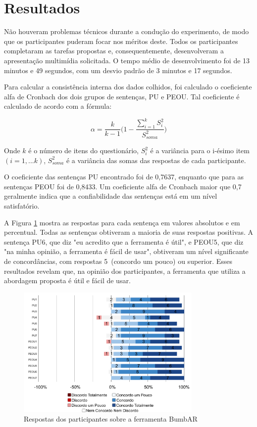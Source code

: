 \documentclass[../main.tex]{subfiles}
\begin{document}
\section{Resultados}
\label{sec:resultados}

Não houveram problemas técnicos durante a condução do experimento, de modo que os participantes puderam focar nos méritos deste. Todos os participantes completaram as tarefas propostas e, consequentemente, desenvolveram a apresentação multimídia solicitada. O tempo médio de desenvolvimento foi de 13 minutos e 49 segundos, com um desvio padrão de 3 minutos e 17 segundos.

Para calcular a consistência interna dos dados colhidos, foi calculado o coeficiente alfa de Cronbach dos dois grupos de sentenças, PU e PEOU. Tal coeficiente é calculado de acordo com a fórmula:

\[\alpha = \frac{k}{k-1}\Bigg(1 - \frac{\sum_{i = 1}^{k}S_i^2}{S_{soma}^2}\Bigg)\]

Onde \(k\) é o número de itens do questionário, \(S_i^2\) é a variância para o i-ésimo item \((i=1,...k)\), \(S_{soma}^2\) é a variância das somas das respostas de cada participante.

O coeficiente das sentenças PU encontrado foi de 0,7637, enquanto que para as sentenças PEOU foi de 0,8433. Um coeficiente alfa de Cronbach maior que 0,7 geralmente indica que a confiabilidade das sentenças está em um nível satisfatório. 

A Figura \ref{fig:resultados} mostra as respostas para cada sentença em valores absolutos e em percentual. Todas as sentenças obtiveram a maioria de suas respostas positivas. A sentença PU6, que diz "eu acredito que a ferramenta é útil", e PEOU5, que diz "na minha opinião, a ferramenta é fácil de usar", obtiveram um nível significante de concordâncias, com respostas 5~(concordo um pouco) ou superior. Esses resultados revelam que, na opinião dos participantes, a ferramenta que utiliza a abordagem proposta é útil e fácil de usar.

\begin{figure}[ht!]
\centering
\includegraphics[width=0.8\textwidth]{IMG/Avaliacao/resultados_bumbar.png}
\caption{Respostas dos participantes sobre a ferramenta BumbAR}
\label{fig:resultados}
\end{figure}
\end{document}
